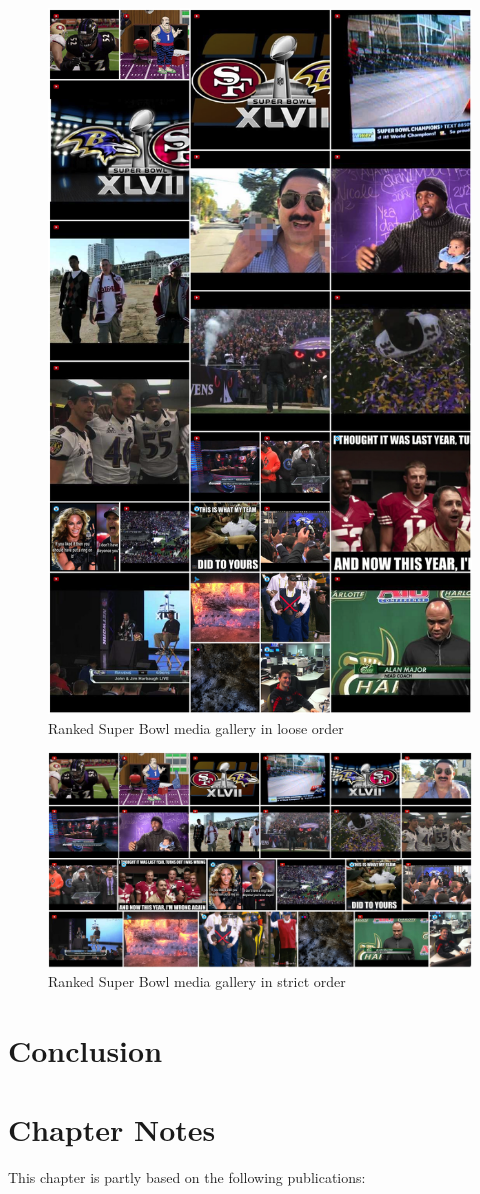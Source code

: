 \begin{figure}[htb]
  \centering
  \includegraphics[width=0.75\linewidth]{loose_order.png}
  \caption[Ranked Super Bowl media gallery in loose order]
  {Ranked Super Bowl media gallery in loose order}
  \label{fig:loose_order}
\end{figure}

\begin{figure}
  \centering
  \includegraphics[width=0.75\linewidth]{strict_order.png}
  \caption[Ranked Super Bowl media gallery in strict order]
  {Ranked Super Bowl media gallery in strict order }
  \label{fig:strict_order}
\end{figure}  


\section{Conclusion}

\section*{Chapter Notes}
This chapter is partly based on the following publications:
